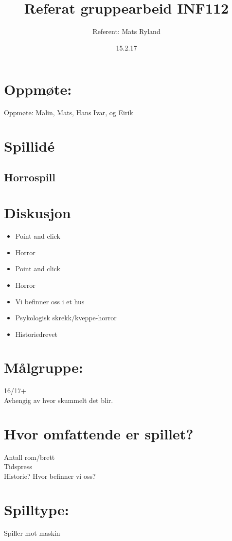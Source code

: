 \documentclass[a4paper]{article}
\begin{document}
\title{Referat gruppearbeid INF112}
\date{15.2.17}

\author{Referent: Mats Ryland}
\maketitle


\section{Oppmøte:}
Oppmøte: Malin, Mats, Hans Ivar, og Eirik

\section{Spillidé}
\subsection{Horrospill}
\section{Diskusjon}

\begin{itemize}
    \item{Point and click}
    \item{Horror}
    \item Point and click
    \item Horror
    \item Vi befinner oss i et hus
    \item Psykologisk skrekk/kveppe-horror
    \item Historiedrevet
\end{itemize}

\section{Målgruppe:}
16/17+ \\
Avhengig av hvor skummelt det blir.\\
\section{Hvor omfattende er spillet?}
Antall rom/brett\\
Tidspress\\
Historie? Hvor befinner vi oss?\\

\section{Spilltype:}
Spiller mot maskin\\
\end{document}
